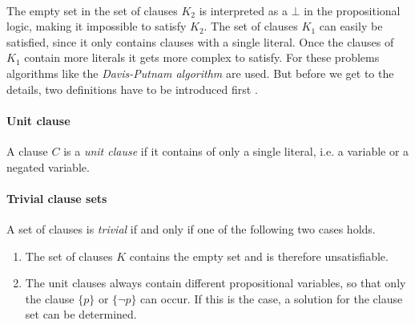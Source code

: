 \\[0.2cm]
The empty set in the set of clauses $K_2$ is interpreted as a $\bot$ in the propositional logic, making it impossible to satisfy $K_2$. The set of clauses $K_1$ can easily be satisfied, since it only contains clauses with a single literal. Once the clauses of $K_1$ contain more literals it gets more complex to satisfy. For these problems algorithms like the \textit{Davis-Putnam algorithm} are used. But before we get to the details, two definitions have to be introduced first \cite{Zhang2000}. 

\paragraph{Unit clause}
A clause $C$ is a \emph{unit clause} if it contains of only a single literal, i.e. a variable or a negated variable.

\paragraph{Trivial clause sets}
A set of clauses is \emph{trivial} if and only if one of the following two cases holds.

\begin{enumerate}
  \item The set of clauses $K$ contains the empty set and is therefore unsatisfiable.
  \item The unit clauses always contain different propositional variables, so that only the clause $\{p\}$ or $\{\neg p\}$ can occur. If this is the case, a solution for the clause set can be determined.
\end{enumerate}

